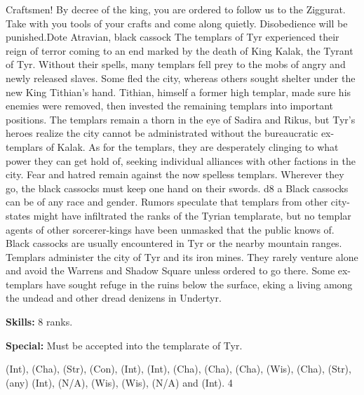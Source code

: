 {Craftsmen! By decree of the king, you are ordered to follow us to the Ziggurat. Take with you tools of your crafts and come along quietly. Disobedience will be punished.}{Dote Atravian, black cassock}
{The templars of Tyr experienced their reign of terror coming to an end marked by the death of King Kalak, the Tyrant of Tyr. Without their spells, many templars fell prey to the mobs of angry and newly released slaves. Some fled the city, whereas others sought shelter under the new King Tithian's hand. Tithian, himself a former high templar, made sure his enemies were removed, then invested the remaining templars into important positions. The templars remain a thorn in the eye of Sadira and Rikus, but Tyr's heroes realize the city cannot be administrated without the bureaucratic ex-templars of Kalak. As for the templars, they are desperately clinging to what power they can get hold of, seeking individual alliances with other factions in the city. Fear and hatred remain against the now spelless templars. Wherever they go, the black cassocks must keep one hand on their swords.}
{d8}
{a}
{Black cassocks can be of any race and gender. Rumors speculate that templars from other city-states might have infiltrated the ranks of the Tyrian templarate, but no templar agents of other sorcerer-kings have been unmasked that the public knows of. Black cassocks are usually encountered in Tyr or the nearby mountain ranges. Templars administer the city of Tyr and its iron mines. They rarely venture alone and avoid the Warrens and Shadow Square unless ordered to go there. Some ex-templars have sought refuge in the ruins below the surface, eking a living among the undead and other dread denizens in Undertyr.}
{
\textbf{Skills:}  8 ranks.

\textbf{Special:} Must be accepted into the templarate of Tyr.
}
{ (Int),  (Cha),  (Str),  (Con),  (Int),  (Int),  (Cha),  (Cha),  (Cha),  (Wis),  (Cha),  (Str),  (any) (Int),  (N/A),  (Wis),  (Wis),  (N/A) and  (Int).}
{4}

